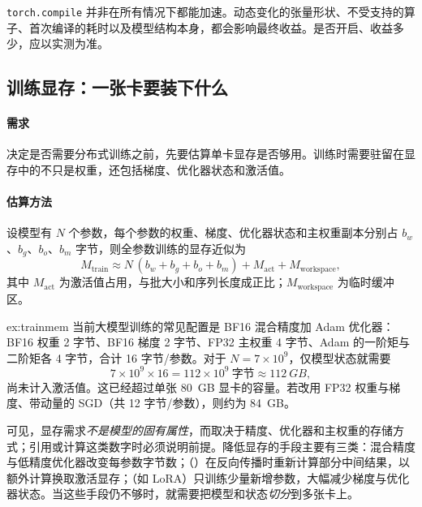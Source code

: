 \begin{pitfall}
\texttt{torch.compile} 并非在所有情况下都能加速。动态变化的张量形状、不受支持的算子、首次编译的耗时以及模型结构本身，都会影响最终收益。是否开启、收益多少，应以实测为准。
\end{pitfall}

\subsection{训练显存：一张卡要装下什么}
\label{subsec:train-mem}

\paragraph{需求} 决定是否需要分布式训练之前，先要估算单卡显存是否够用。训练时需要驻留在显存中的不只是权重，还包括梯度、优化器状态和激活值。

\paragraph{估算方法} 设模型有 $N$ 个参数，每个参数的权重、梯度、优化器状态和主权重副本分别占 $b_w$、$b_g$、$b_o$、$b_m$ 字节，则全参数训练的显存近似为
\begin{equation}
  M_{\mathrm{train}} \approx N\,(b_w+b_g+b_o+b_m) + M_{\mathrm{act}} + M_{\mathrm{workspace}},
  \label{eq:train-mem}
\end{equation}
其中 $M_{\mathrm{act}}$ 为激活值占用，与批大小和序列长度成正比；$M_{\mathrm{workspace}}$ 为临时缓冲区。

\begin{example}[7B 模型的训练显存]{ex:trainmem}
当前大模型训练的常见配置是 BF16 混合精度加 Adam 优化器\cite{rajbhandari2020zero}：BF16 权重 2 字节、BF16 梯度 2 字节、FP32 主权重 4 字节、Adam 的一阶矩与二阶矩各 4 字节，合计 16 字节/参数。对于 $N=7\times10^9$，仅模型状态就需要
\[
  7\times10^{9}\times16 = 112\times10^{9}\ \text{字节} \approx \SI{112}{GB},
\]
尚未计入激活值。这已经超过单张 \SI{80}{GB} 显卡的容量。若改用 FP32 权重与梯度、带动量的 SGD（共 12 字节/参数），则约为 \SI{84}{GB}。
\end{example}

可见，显存需求\emph{不是模型的固有属性}，而取决于精度、优化器和主权重的存储方式；引用或计算这类数字时必须说明前提。降低显存的手段主要有三类：混合精度与低精度优化器改变每参数字节数；（）在反向传播时重新计算部分中间结果，以额外计算换取激活显存；（如 LoRA\cite{hu2021lora}）只训练少量新增参数，大幅减少梯度与优化器状态。当这些手段仍不够时，就需要把模型和状态\emph{切分}到多张卡上。

